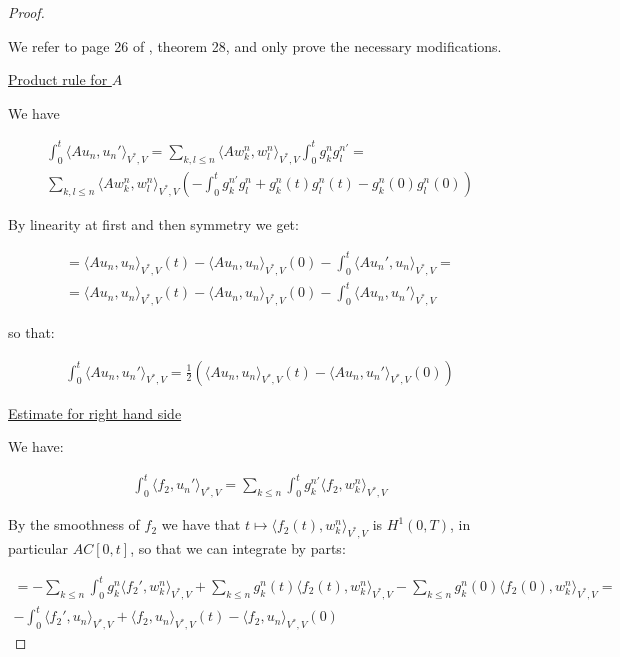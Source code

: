 \documentclass[english,a4paper,10pt,oneside]{scrbook}	%
\theoremstyle{break}
\newenvironment{mproof}[1][\proofname]{%
  \begin{proof}[#1]$ $\par\nobreak\ignorespaces
}{%
  \end{proof}
}
\renewcommand*{\proofname}{Proof}
\theoremstyle{remark}
\begin{document}
\begin{mproof}
We refer to page 26 of \cite{gilardi}, theorem 28, and only prove the necessary modifications.

\underline{Product rule for $A$}

We have 

\begin{align*}
\int_0^t \langle Au_n,u_n' \rangle_{V^*,V} = \sum_{k,l\leq n} \langle Aw^n_k,w^n_l \rangle_{V^*,V} \int_0^t g_k^n g_l^{n '} = \\
\sum_{k,l\leq n} \langle Aw^n_k,w^n_l \rangle_{V^*,V} \left (-\int_0^t g_k^{n'} g_l^n + g_k^n(t) g_l^n(t)-g_k^n(0) g_l^n(0) \right )
\end{align*}

By linearity at first and then symmetry we get:

\begin{align*}
	= \langle Au_n,u_n \rangle_{V^*,V}(t)-\langle Au_n,u_n \rangle_{V^*,V}(0)-\int_0^t\langle Au_n',u_n \rangle_{V^*,V}=\\
	= \langle Au_n,u_n \rangle_{V^*,V}(t)-\langle Au_n,u_n \rangle_{V^*,V}(0)-\int_0^t\langle Au_n,u_n' \rangle_{V^*,V}
\end{align*}

so that:

\begin{align*}
	\int_0^t \langle Au_n,u_n' \rangle_{V^*,V} = \frac{1}{2}\left( \langle Au_n,u_n \rangle_{V^*,V}(t)-\langle Au_n,u_n' \rangle_{V^*,V}(0) \right )
\end{align*}

\underline{Estimate for right hand side}

We have:

\begin{align*}
	\int_0^t \langle f_2,u_n' \rangle_{V^*,V} = \sum_{k\leq n}\int_0^tg_k^{n'}\langle f_2,w_k^n \rangle_{V^*,V}
\end{align*}

By the smoothness of $f_2$ we have that $t \mapsto \langle f_2(t),w_k^n \rangle_{V^*,V}$ is $H^1(0,T)$, in particular $AC[0,t]$, so that we can integrate by parts:

\begin{align*}
	 = - \sum_{k\leq n}\int_0^tg_k^{n}\langle f_2',w_k^n \rangle_{V^*,V} + \sum_{k\leq n} g_k^{n}(t)\langle f_2(t),w_k^n \rangle_{V^*,V} - \sum_{k\leq n} g_k^{n}(0)\langle f_2(0),w_k^n \rangle_{V^*,V} = \\
	 -\int_0^t \langle f_2',u_n \rangle_{V^*,V} + \langle f_2,u_n \rangle_{V^*,V}(t)-\langle f_2,u_n \rangle_{V^*,V}(0)
\end{align*}


\end{mproof}
\end{document}
